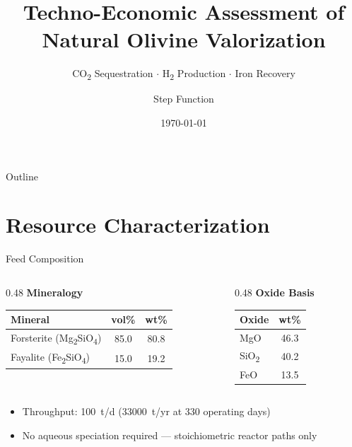 \documentclass[aspectratio=169]{beamer}
\title{Techno-Economic Assessment of\\[4pt] \textbf{Natural Olivine} Valorization}
\subtitle{CO\textsubscript{2} Sequestration \(\cdot\) H\textsubscript{2} Production \(\cdot\) Iron Recovery}
\author{Step Function}
\date{\today}
\begin{document}
\begin{frame}
\titlepage
\end{frame}

\begin{frame}{Outline}
\tableofcontents
\end{frame}

\section{Resource Characterization}

\begin{frame}{Feed Composition}

\begin{columns}[T]
\begin{column}{0.48\textwidth}
\textbf{Mineralogy}
\begin{table}
\centering\small
\begin{tabular}{lcc}
\toprule
\textbf{Mineral} & \textbf{vol\%} & \textbf{wt\%} \\
\midrule
Forsterite (Mg\textsubscript{2}SiO\textsubscript{4}) & 85.0 & 80.8 \\
Fayalite (Fe\textsubscript{2}SiO\textsubscript{4}) & 15.0 & 19.2 \\
\bottomrule
\end{tabular}
\end{table}
\end{column}
\begin{column}{0.48\textwidth}
\textbf{Oxide Basis}
\begin{table}
\centering\small
\begin{tabular}{lc}
\toprule
\textbf{Oxide} & \textbf{wt\%} \\
\midrule
MgO & 46.3 \\
SiO\textsubscript{2} & 40.2 \\
FeO & 13.5 \\
\bottomrule
\end{tabular}
\end{table}
\end{column}
\end{columns}

\vspace{1em}
\begin{itemize}
\item Throughput: \SI{100}{t/d} (\SI{33000}{t/yr} at 330 operating days)
\item No aqueous speciation required --- stoichiometric reactor paths only
\end{itemize}
\end{frame}
\end{document}
